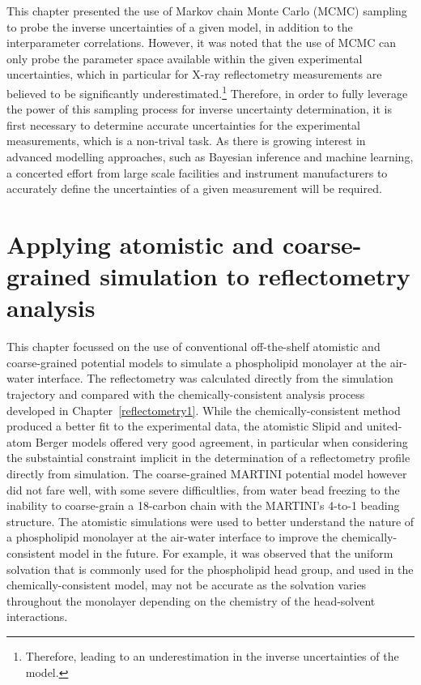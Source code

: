 This chapter presented the use of Markov chain Monte Carlo (MCMC) sampling to probe the inverse uncertainties of a given model, in addition to the interparameter correlations.
However, it was noted that the use of MCMC can only probe the parameter space available within the given experimental uncertainties, which in particular for X-ray reflectometry measurements are believed to be significantly underestimated.\footnote{Therefore, leading to an underestimation in the inverse uncertainties of the model.}
Therefore, in order to fully leverage the power of this sampling process for inverse uncertainty determination, it is first necessary to determine accurate uncertainties for the experimental measurements, which is a non-trival task.
As there is growing interest in advanced modelling approaches, such as Bayesian inference and machine learning, a concerted effort from large scale facilities and instrument manufacturers to accurately define the uncertainties of a given measurement will be required.

\section{Applying atomistic and coarse-grained simulation to reflectometry analysis}
This chapter focussed on the use of conventional off-the-shelf atomistic and coarse-grained potential models to simulate a phospholipid monolayer at the air-water interface.
The reflectometry was calculated directly from the simulation trajectory and compared with the chemically-consistent analysis process developed in Chapter~\ref{reflectometry1}.
While the chemically-consistent method produced a better fit to the experimental data, the atomistic Slipid and united-atom Berger models offered very good agreement, in particular when considering the substaintial constraint implicit in the determination of a reflectometry profile directly from simulation.
The coarse-grained MARTINI potential model however did not fare well, with some severe difficultlies, from water bead freezing to the inability to coarse-grain a 18-carbon chain with the MARTINI's 4-to-1 beading structure.
The atomistic simulations were used to better understand the nature of a phospholipid monolayer at the air-water interface to improve the chemically-consistent model in the future.
For example, it was observed that the uniform solvation that is commonly used for the phospholipid head group, and used in the chemically-consistent model, may not be accurate as the solvation varies throughout the monolayer depending on the chemistry of the head-solvent interactions.

